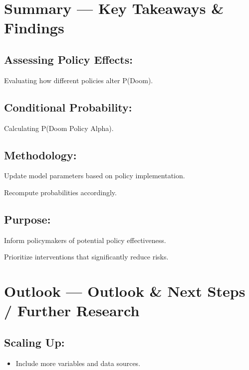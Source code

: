 \documentclass[
  letterpaper,
]{book}
\providecommand{\tightlist}{%
  \setlength{\itemsep}{0pt}\setlength{\parskip}{0pt}}
\begin{document}
\section{Summary --- Key Takeaways \&
Findings}\label{summary-key-takeaways-findings}

\subsection{Assessing Policy Effects:}\label{assessing-policy-effects}

Evaluating how different policies alter P(Doom).

\subsection{Conditional Probability:}\label{conditional-probability}

Calculating P(Doom \textbar{} Policy Alpha).

\subsection{Methodology:}\label{methodology-1}

Update model parameters based on policy implementation.

Recompute probabilities accordingly.

\subsection{Purpose:}\label{purpose}

Inform policymakers of potential policy effectiveness.

Prioritize interventions that significantly reduce risks.

\section{Outlook --- Outlook \& Next Steps / Further
Research}\label{outlook-outlook-next-steps-further-research}

\subsection{Scaling Up:}\label{scaling-up}

\begin{itemize}
\tightlist
\item
  Include more variables and data sources.
\end{itemize}
\end{document}
